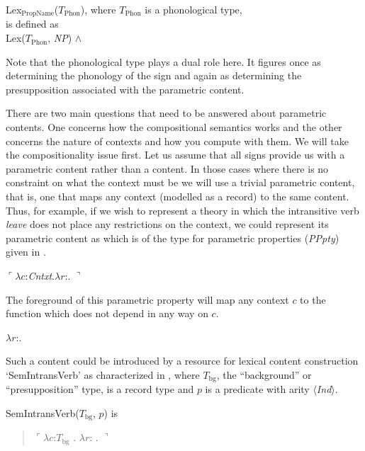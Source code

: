\begin{ex} 
Lex$_{\mathrm{PropName}}$($T_{\mathrm{Phon}}$), where
$T_{\mathrm{Phon}}$ is a phonological type,
\\
is defined as \\
Lex($T_{\mathrm{Phon}}$, \textit{NP}) \d{$\wedge$}
\end{ex} 
Note that the phonological type plays a dual role here.  It figures
once as determining the phonology of the sign and again as determining
the presupposition associated with the parametric content.   
  

There are two main questions that need to be answered about parametric
contents.  One concerns how the compositional semantics works and the
other concerns the nature of contexts and how you compute with them.
We will take the compositionality issue first.  Let us assume that all
signs provide us with a parametric content rather than a content.  In
those cases where there is no constraint on what the context must be
we will use a trivial parametric content, that is, one that maps any
context (modelled as a record) to the same content.  Thus, for
example, if we wish to represent a theory in which the intransitive
verb \textit{leave} does not place any restrictions on the context, we
could represent its parametric content as  which is of the
type for parametric properties (\textit{PPpty}) given in .
\begin{ex}
\begin{subex}
\item $\ulcorner\lambda c$:\textit{Cntxt}.$\lambda r$:.
$\urcorner$

\item {}
\end{subex}
\label{ex:parametricLeave}

\end{ex}
The foreground of this parametric property will map any context $c$ to the function \nexteg{} which does not depend in
any way on $c$.
\begin{ex} 
$\lambda r$:.
\end{ex} 
  
Such a content could be introduced by a resource for
lexical content construction `SemIntransVerb' as characterized in
\nexteg{}, where $T_{\mathrm{bg}}$, the
``background'' or ``presupposition'' type, is a record type and $p$ is a predicate with arity $\langle$\textit{Ind}$\rangle$.
\begin{ex} 
  SemIntransVerb($T_{\mathrm{bg}}$, $p$) is
  \begin{quote}
$\ulcorner\lambda c$:$T_{\mathrm{bg}}$ . $\lambda
r$:
. $\urcorner$
\end{quote}

\end{ex}


